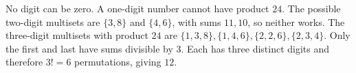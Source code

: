 No digit can be zero. A one-digit number cannot have product $ 24 $. The possible two-digit multisets are $\{3,8\}$ and $\{4,6\}$, with sums $ 11,10 $, so neither works. The three-digit multisets with product $ 24 $ are $\{1,3,8\},\{1,4,6\},\{2,2,6\},\{2,3,4\}$. Only the first and last have sums divisible by $ 3 $. Each has three distinct digits and therefore $ 3!=6 $ permutations, giving $\boxed{12}$.
